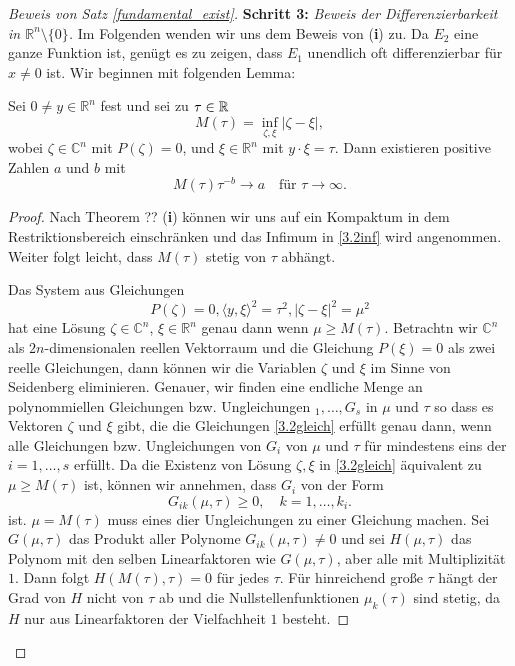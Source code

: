 \begin{proof}[Beweis von Satz \ref{fundamental_exist}]
\textbf{Schritt 3:} \emph{Beweis der Differenzierbarkeit in $\mathbb R^n\setminus\{0\}$.}
Im Folgenden wenden wir uns dem Beweis von ({\bf i}) zu. Da $E_2$ eine ganze Funktion ist, genügt es zu zeigen, dass $E_1$ unendlich oft differenzierbar für $x\neq 0$ ist.  Wir beginnen mit folgenden Lemma:
\begin{lem}\label{3.2lem1}
Sei $0\neq y \in \mathbb R^n$ fest und sei zu $\tau\in\mathbb R$
\begin{equation}\label{3.2inf}
M(\tau) = \inf_{\zeta, \xi} |\zeta-\xi|,
\end{equation}
wobei $\zeta\in \mathbb C^n$ mit $P(\zeta)=0$, und $\xi\in \mathbb R^n$ mit $y\cdot \xi= \tau$. Dann existieren positive Zahlen $a$ und $b$ mit
\begin{equation}\label{3.2to}
M(\tau) \tau^{-b} \to a\quad \text{für } \tau \to \infty.
\end{equation}
\end{lem}
\begin{proof}
Nach Theorem ?? ({\bf i}) können wir uns auf ein Kompaktum in dem Restriktionsbereich einschränken
 und das Infimum in \eqref{3.2inf} wird angenommen. Weiter folgt leicht, dass $M(\tau)$ stetig von $\tau$ abhängt.  
 
 Das System aus Gleichungen
 \begin{equation}\label{3.2gleich}
 P(\zeta)=0, \langle y, \xi\rangle^2 =\tau^2, |\zeta-\xi|^2=\mu^2
 \end{equation}
 hat eine Lösung $\zeta\in \mathbb C^n$, $\xi \in \mathbb R^n$ genau dann wenn $\mu \ge M(\tau)$. 
 Betrachtn wir $\mathbb C^n$ als $2n$-dimensionalen reellen Vektorraum und die Gleichung $P(\xi)=0$ als zwei reelle Gleichungen, dann können wir die Variablen $\zeta$ und $\xi$ im Sinne von Seidenberg eliminieren. Genauer, wir finden  eine endliche Menge an polynommiellen Gleichungen bzw. Ungleichungen $_1,\ldots, G_s$ in $\mu$ und $\tau$ so dass es Vektoren $\zeta$ und $\xi$ gibt, die die Gleichungen \eqref{3.2gleich} erfüllt genau dann, wenn alle Gleichungen bzw. Ungleichungen von $G_i$ von $\mu$ und $\tau$ für mindestens eins der $i=1,\ldots,s$ erfüllt. Da die Existenz von Lösung $\zeta, \xi$ in \eqref{3.2gleich} äquivalent zu $\mu \ge M(\tau)$ ist, können wir annehmen, dass $G_i$ von der Form
 \begin{equation}
 G_{ik}(\mu, \tau)\ge 0,  \quad k=1,\ldots,k_i.
 \end{equation}
ist. $\mu=M(\tau)$ muss eines dier Ungleichungen zu einer Gleichung machen. Sei $G(\mu,\tau)$ das Produkt aller Polynome $G_{ik}(\mu,\tau)\neq 0$ und sei $H(\mu, \tau)$ das Polynom mit den selben Linearfaktoren wie $G(\mu,\tau)$, aber alle mit Multiplizität $1$.   Dann folgt $H(M(\tau),\tau)=0$ für jedes $\tau$.  Für hinreichend große $\tau$ hängt der Grad von $H$ nicht von $\tau$ ab und die Nullstellenfunktionen $\mu_k(\tau)$ sind stetig, da $H$ nur aus Linearfaktoren der Vielfachheit $1$ besteht.  
\end{proof}
  


\end{proof}
